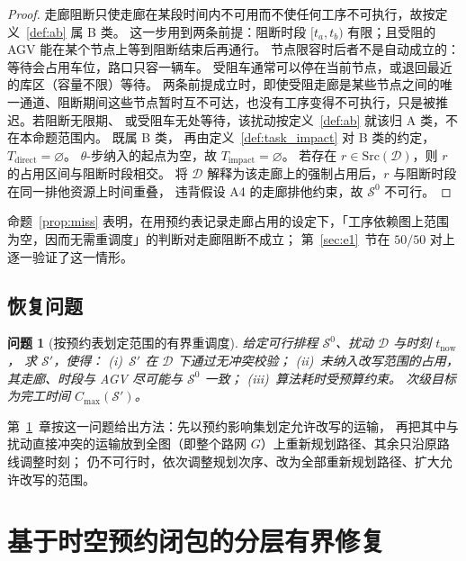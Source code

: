 \documentclass[manuscript,screen,review]{acmart}
\newcommand{\NPairs}{50}
\newcommand{\PassMiss}{\NPairs/\NPairs}      %
\newtheorem*{problem*}{问题}
\begin{document}
\begin{proof}
走廊阻断只使走廊在某段时间内不可用而不使任何工序不可执行，故按定义~\ref{def:ab} 属 B 类。
这一步用到两条前提：阻断时段 \([t_a,t_b)\) 有限；且受阻的 AGV 能在某个节点上等到阻断结束后再通行。
节点限容时后者不是自动成立的：等待会占用车位，路口只容一辆车。
受阻车通常可以停在当前节点，或退回最近的库区（容量不限）等待。
两条前提成立时，即使受阻走廊是某些节点之间的唯一通道、阻断期间这些节点暂时互不可达，也没有工序变得不可执行，只是被推迟。若阻断无限期、
或受阻车无处等待，该扰动按定义~\ref{def:ab} 就该归 A 类，不在本命题范围内。
既属 B 类，
再由定义~\ref{def:task_impact} 对 B 类的约定，\(T_{\mathrm{direct}}=\varnothing\)。
\(\theta\)-步纳入的起点为空，故 \(T_{\mathrm{impact}}=\varnothing\)。
若存在 \(r\in\mathrm{Src}(\mathcal{D})\)，则 \(r\) 的占用区间与阻断时段相交。
将 \(\mathcal{D}\) 解释为该走廊上的强制占用后，\(r\) 与阻断时段在同一排他资源上时间重叠，
违背假设 A4 的走廊排他约束，故 \(\mathcal{S}^0\) 不可行。
\end{proof}

命题~\ref{prop:miss} 表明，在用预约表记录走廊占用的设定下，「工序依赖图上范围为空，因而无需重调度」的判断对走廊阻断不成立；
第~\ref{sec:e1}~节在 \(\PassMiss\) 对上逐一验证了这一情形。

\subsection{恢复问题}
\label{sec:recovery_problem}

\begin{problem*}[按预约表划定范围的有界重调度]
\label{prob:recovery}
给定可行排程 \(\mathcal{S}^0\)、扰动 \(\mathcal{D}\) 与时刻 \(t_{\mathrm{now}}\)，
求 \(\mathcal{S}'\)，使得：
(i)~\(\mathcal{S}'\) 在 \(\mathcal{D}\) 下通过无冲突校验；
(ii)~未纳入改写范围的占用，其走廊、时段与 AGV 尽可能与 \(\mathcal{S}^0\) 一致；
(iii)~算法耗时受预算约束。
次级目标为完工时间 \(C_{\max}(\mathcal{S}')\)。
\end{problem*}

第~\ref{sec:strc}~章按这一问题给出方法：先以预约影响集划定允许改写的运输，
再把其中与扰动直接冲突的运输放到全图（即整个路网 \(G\)）上重新规划路径、其余只沿原路线调整时刻；
仍不可行时，依次调整规划次序、改为全部重新规划路径、扩大允许改写的范围。

\section{基于时空预约闭包的分层有界修复}
\label{sec:strc}
\label{sec:repair}
\end{document}
